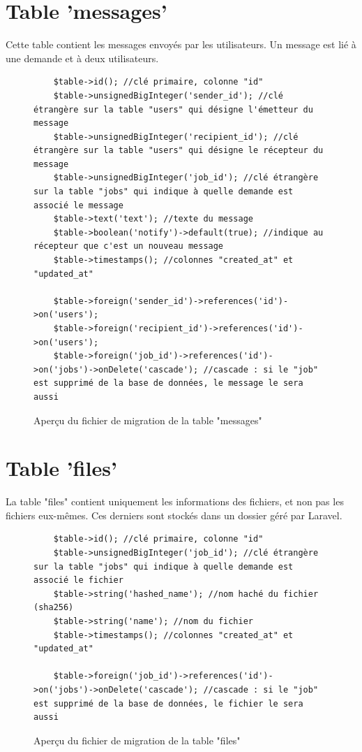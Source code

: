 \documentclass[
    iai, %
    eai, %
]{heig-tb}
\begin{document}
\newpage
\section{Table 'messages'}
Cette table contient les messages envoyés par les utilisateurs. Un message est lié à une demande et à deux utilisateurs.

\begin{figure}[h]
  \begin{verbatim}
    $table->id(); //clé primaire, colonne "id"
    $table->unsignedBigInteger('sender_id'); //clé étrangère sur la table "users" qui désigne l'émetteur du message
    $table->unsignedBigInteger('recipient_id'); //clé étrangère sur la table "users" qui désigne le récepteur du message
    $table->unsignedBigInteger('job_id'); //clé étrangère sur la table "jobs" qui indique à quelle demande est associé le message
    $table->text('text'); //texte du message
    $table->boolean('notify')->default(true); //indique au récepteur que c'est un nouveau message
    $table->timestamps(); //colonnes "created_at" et "updated_at"

    $table->foreign('sender_id')->references('id')->on('users');
    $table->foreign('recipient_id')->references('id')->on('users');
    $table->foreign('job_id')->references('id')->on('jobs')->onDelete('cascade'); //cascade : si le "job" est supprimé de la base de données, le message le sera aussi
  \end{verbatim}
  \caption{Aperçu du fichier de migration de la table "messages"}
\end{figure}

\section{Table 'files'}
La table "files" contient uniquement les informations des fichiers, et non pas les fichiers eux-mêmes. Ces derniers sont stockés dans un dossier géré par Laravel.

\begin{figure}[h]
  \begin{verbatim}
    $table->id(); //clé primaire, colonne "id"
    $table->unsignedBigInteger('job_id'); //clé étrangère sur la table "jobs" qui indique à quelle demande est associé le fichier
    $table->string('hashed_name'); //nom haché du fichier (sha256)
    $table->string('name'); //nom du fichier
    $table->timestamps(); //colonnes "created_at" et "updated_at"

    $table->foreign('job_id')->references('id')->on('jobs')->onDelete('cascade'); //cascade : si le "job" est supprimé de la base de données, le fichier le sera aussi
  \end{verbatim}
  \caption{Aperçu du fichier de migration de la table "files"}
\end{figure}
\end{document}
